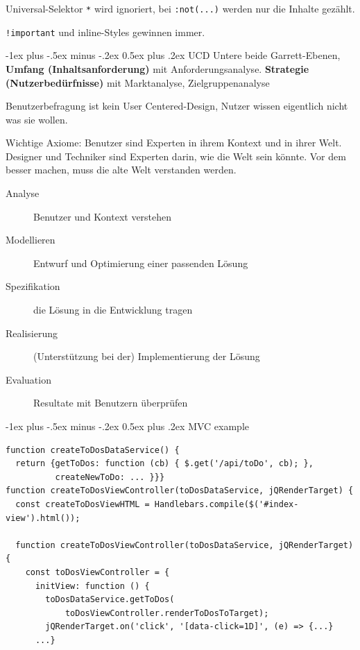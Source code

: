 \documentclass[10pt,landscape,a4paper]{article}
\makeatletter
\newcommand{\css}[1]{\texttt{#1}}
\renewcommand{\section}{\@startsection{section}{1}{0mm}%
                                {-1ex plus -.5ex minus -.2ex}%
                                {0.5ex plus .2ex}%
                                {\normalfont\large\bfseries}}
\makeatother
\begin{document}
\begin{multicols*}{4}
Universal-Selektor \css{*} wird ignoriert, bei \css{:not(...)} werden nur die Inhalte gezählt.

\css{!important} und inline-Styles gewinnen immer.


\section{UCD}
Untere beide Garrett-Ebenen, \textbf{Umfang (Inhaltsanforderung)} mit Anforderungsanalyse.
\textbf{Strategie (Nutzerbedürfnisse)} mit Marktanalyse, Zielgruppenanalyse

Benutzerbefragung ist kein User Centered-Design, Nutzer wissen eigentlich
nicht was sie wollen.

Wichtige Axiome: Benutzer sind Experten in ihrem Kontext und in ihrer
Welt. Designer und Techniker sind Experten darin, wie die Welt sein
könnte. Vor dem besser machen, muss die alte Welt verstanden werden.

\begin{description}
  \item[Analyse] Benutzer und Kontext verstehen
  \item[Modellieren] Entwurf und Optimierung einer passenden Lösung
  \item[Spezifikation] die Lösung in die Entwicklung tragen
  \item[Realisierung] (Unterstützung bei der) Implementierung der Lösung
  \item[Evaluation] Resultate mit Benutzern überprüfen
\end{description}

\section{MVC example}

\begin{verbatim}
function createToDosDataService() {
  return {getToDos: function (cb) { $.get('/api/toDo', cb); },
          createNewToDo: ... }}}
function createToDosViewController(toDosDataService, jQRenderTarget) {
  const createToDosViewHTML = Handlebars.compile($('#index-view').html());
  
  function createToDosViewController(toDosDataService, jQRenderTarget) {
    const toDosViewController = {
      initView: function () {
        toDosDataService.getToDos(
            toDosViewController.renderToDosToTarget);
        jQRenderTarget.on('click', '[data-click=1D]', (e) => {...}
      ...}


\end{verbatim}
\end{multicols*}
\end{document}
